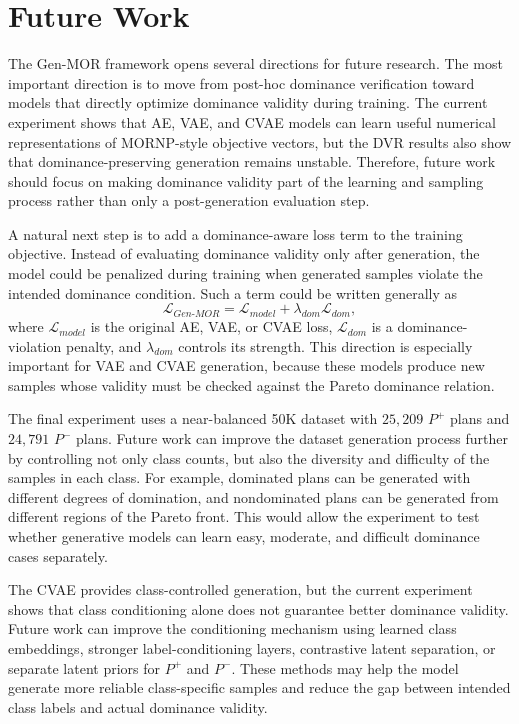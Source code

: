\section{Future Work}
\label{sec:future_work}

The Gen-MOR framework opens several directions for future research. The most important direction is to move from post-hoc dominance verification toward models that directly optimize dominance validity during training. The current experiment shows that AE, VAE, and CVAE models can learn useful numerical representations of MORNP-style objective vectors, but the DVR results also show that dominance-preserving generation remains unstable. Therefore, future work should focus on making dominance validity part of the learning and sampling process rather than only a post-generation evaluation step.

A natural next step is to add a dominance-aware loss term to the training objective. Instead of evaluating dominance validity only after generation, the model could be penalized during training when generated samples violate the intended dominance condition. Such a term could be written generally as
\begin{equation}
    \mathcal{L}_{Gen\text{-}MOR}
    =
    \mathcal{L}_{model}
    +
    \lambda_{dom}\mathcal{L}_{dom},
    \label{eq:future_dominance_loss}
\end{equation}
where $\mathcal{L}_{model}$ is the original AE, VAE, or CVAE loss, $\mathcal{L}_{dom}$ is a dominance-violation penalty, and $\lambda_{dom}$ controls its strength. This direction is especially important for VAE and CVAE generation, because these models produce new samples whose validity must be checked against the Pareto dominance relation.

The final experiment uses a near-balanced 50K dataset with $25{,}209$ $P^{+}$ plans and $24{,}791$ $P^{-}$ plans. Future work can improve the dataset generation process further by controlling not only class counts, but also the diversity and difficulty of the samples in each class. For example, dominated plans can be generated with different degrees of domination, and nondominated plans can be generated from different regions of the Pareto front. This would allow the experiment to test whether generative models can learn easy, moderate, and difficult dominance cases separately.

The CVAE provides class-controlled generation, but the current experiment shows that class conditioning alone does not guarantee better dominance validity. Future work can improve the conditioning mechanism using learned class embeddings, stronger label-conditioning layers, contrastive latent separation, or separate latent priors for $P^{+}$ and $P^{-}$. These methods may help the model generate more reliable class-specific samples and reduce the gap between intended class labels and actual dominance validity.

